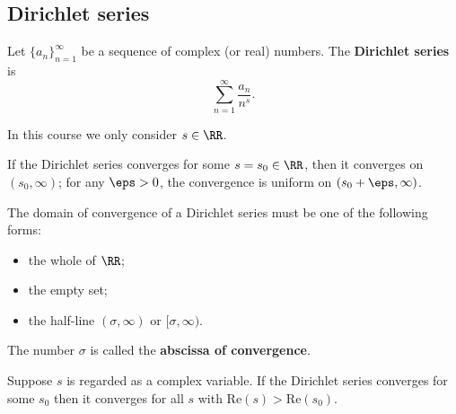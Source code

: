 \documentclass[12pt, a4paper]{article}
\begin{document}
\subsection{Dirichlet series}

\begin{definition}
    Let \(\{a_n\}_{n=1}^{\infty}\) be a sequence of complex (or real) numbers. The \textbf{Dirichlet series} is
    \[\sum_{n=1}^{\infty} \frac{a_n}{n^s}.\]
\end{definition}

\begin{mdremark}
    In this course we only consider \(s \in \RR\).
\end{mdremark}

\begin{mdthm}
    If the Dirichlet series converges for some \(s=s_0 \in \RR\), then it converges on \((s_0,\infty)\); for any \(\eps>0\), the convergence is uniform on \((s_0+\eps,\infty)\).
\end{mdthm}

\begin{theorem}
    The domain of convergence of a Dirichlet series must be one of the following forms:
    \begin{itemize}
        \item the whole of \(\RR\);
        \item the empty set;
        \item the half-line \((\sigma,\infty)\) or \([\sigma,\infty)\).
    \end{itemize}
    The number \(\sigma\) is called the \textbf{abscissa of convergence}.
\end{theorem}

\begin{mdthm}
    Suppose \(s\) is regarded as a complex variable. If the Dirichlet series converges for some \(s_0\) then it converges for all \(s\) with \(\text{Re}(s) > \text{Re}(s_0)\).
\end{mdthm}


\end{document}
